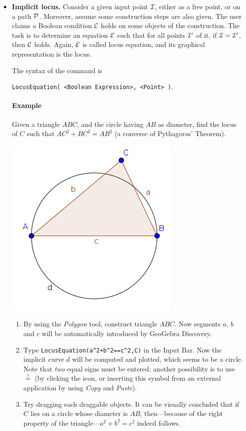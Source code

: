 \documentclass{article}
\begin{document}
\begin{itemize}
\item \textbf{Implicit locus.}
Consider a given input point $\cal I$, either as a free point, or on a path $\cal P$. Moreover, assume some construction steps are also given. The user claims a Boolean condition $\cal C$  holds on some objects of the construction. The task is to determine an equation $\cal E$ such that for all points $\cal{I}'$ of it, if $\cal{I}=\cal{I}'$, then $\cal{C}$ holds. Again, $\cal{E}$ is called locus equation, and its graphical representation is the locus.

The syntax of the command is
\begin{center}
    \texttt{LocusEquation( <Boolean Expression>, <Point> )}.
\end{center}


\paragraph{Example}
Given a triangle $ABC$, and the circle having $AB$ as diameter, find the locus of $C$ such that $AC^2+BC^2=AB^2$ (a converse of Pythagoras' Theorem).
\begin{center}
\includegraphics[scale=0.5]{LocusEquation-example-implicit}
\end{center}
\begin{enumerate}
    \item By using the \textit{Polygon} tool, construct triangle $ABC$. Now segments $a$, $b$ and $c$ will be automatically introduced by GeoGebra Discovery.
    \item Type \texttt{LocusEquation(a\^{}2+b\^{}2==c\^{}2,C)} in the Input Bar. Now the implicit curve $d$ will be computed and plotted, which seems to be a circle.
    Note that \textit{two} equal signs must be entered; another possibility is to use $\stackrel{?}{=}$ (by clicking the \framebox{$\alpha$} icon, or inserting this symbol from an external application by using \textit{Copy} and \textit{Paste}).
    \item Try dragging each draggable objects. It can be visually concluded that if $C$ lies on a circle whose diameter is $AB$, then---because of the right property of the triangle---$a^2+b^2=c^2$ indeed follows.
\end{enumerate}
\end{itemize}
\end{document}
